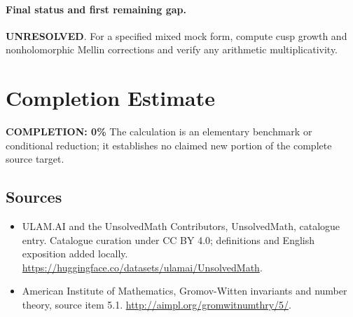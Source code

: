 \documentclass[11pt]{article}
\begin{document}
\paragraph{Final status and first remaining gap.}
\textbf{UNRESOLVED}. For a specified mixed mock form, compute cusp growth and nonholomorphic Mellin corrections and verify any arithmetic multiplicativity.

\section{Completion Estimate}
\noindent\textbf{COMPLETION: 0\%}
The calculation is an elementary benchmark or conditional reduction; it establishes no claimed new portion of the complete source target.

\subsection{Sources}
\begin{itemize}
\item[\hypertarget{source:statement:1}{S1}] ULAM.AI and the UnsolvedMath Contributors, UnsolvedMath, catalogue entry. Catalogue curation under CC BY 4.0; definitions and English exposition added locally.
\url{https://huggingface.co/datasets/ulamai/UnsolvedMath}.
\item[\hypertarget{source:statement:2}{S2}] American Institute of Mathematics, Gromov-Witten invariants and number theory, source item 5.1.
\url{http://aimpl.org/gromwitnumthry/5/}.
\end{itemize}
\label{end:statement}
\end{document}
